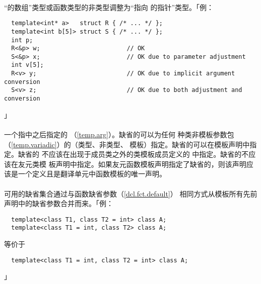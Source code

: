 \paragraph{}
``的数组''类型或函数类型的非类型调整为``指向
的指针''类型。「例：
\begin{lstlisting}
  template<int* a>   struct R { /* ... */ };
  template<int b[5]> struct S { /* ... */ };
  int p;
  R<&p> w;                        // OK
  S<&p> x;                        // OK due to parameter adjustment
  int v[5];
  R<v> y;                         // OK due to implicit argument conversion
  S<v> z;                         // OK due to both adjustment and conversion
\end{lstlisting}」

\paragraph{}
一个指中\tm{=}之后指定的
（\ref{temp.arg}）。缺省的可以为任何
种类非模板参数包（\ref{temp.variadic}）的（类型、非类型、
模板）指定。缺省的可以在模板声明中指定。缺省的
不应该在出现于成员类之外的类模板成员定义的
中指定。缺省的不应该在友元类模
板声明中指定。如果友元函数模板声明指定了缺省的，则该声明应
该是一个定义且是翻译单元中函数模板的唯一声明。

\paragraph{}
可用的缺省集合通过与函数缺省参数（\ref{dcl.fct.default}）
相同方式从模板所有先前声明中的缺省参数合并而来。「例：
\begin{lstlisting}
  template<class T1, class T2 = int> class A;
  template<class T1 = int, class T2> class A;
\end{lstlisting}
等价于
\begin{lstlisting}
  template<class T1 = int, class T2 = int> class A;
\end{lstlisting}」

